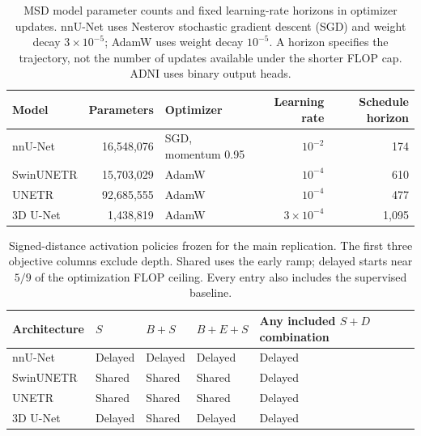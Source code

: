 \documentclass[12pt,a4paper]{article}
\begin{document}
\begin{table}[htbp]
\centering\small{}
\begin{tabular}{@{}P{2.5cm}rP{3.0cm}rr@{}}
\hline
Model & Parameters & Optimizer & Learning rate & Schedule horizon \\
\hline
nnU-Net & 16,548,076 & SGD, momentum 0.95 & $10^{-2}$ & 174 \\
SwinUNETR & 15,703,029 & AdamW & $10^{-4}$ & 610 \\
UNETR & 92,685,555 & AdamW & $10^{-4}$ & 477 \\
3D U-Net & 1,438,819 & AdamW & $3\times10^{-4}$ & 1,095 \\
\hline
\end{tabular}
\caption{MSD model parameter counts and fixed learning-rate horizons in optimizer
updates. nnU-Net uses Nesterov stochastic gradient descent (SGD) and weight decay $3\times10^{-5}$;
AdamW uses weight decay $10^{-5}$. A horizon specifies the trajectory,
not the number of updates available under the shorter FLOP cap. ADNI
uses binary output heads.}
\label{tab:main-model-settings}
\end{table}
\FloatBarrier
\begin{table}[htbp]
\centering
\small
{}
\renewcommand{\arraystretch}{1.2}
\begin{tabular}{@{}P{3.0cm}P{2.0cm}P{2.2cm}P{2.7cm}P{3.8cm}@{}}
\hline
Architecture & $S$ & $B+S$ & $B+E+S$ & Any included $S+D$ combination \\
\hline
nnU-Net & Delayed & Delayed & Delayed & Delayed \\
SwinUNETR & Shared & Shared & Shared & Delayed \\
UNETR & Shared & Shared & Shared & Delayed \\
3D U-Net & Delayed & Shared & Delayed & Delayed \\
\hline
\end{tabular}
\caption{Signed-distance activation policies frozen for the main
replication. The first three objective columns exclude depth. Shared
uses the early ramp; delayed starts near $5/9$ of the optimization
FLOP ceiling. Every entry also includes the supervised baseline.}
\label{tab:sdf-activation-policies}
\end{table}
\FloatBarrier
\end{document}
